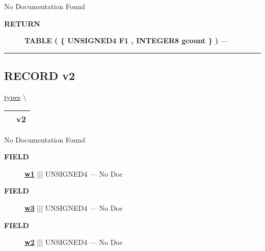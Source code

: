 \par





No Documentation Found








\par
\begin{description}
\item [\colorbox{tagtype}{\color{white} \textbf{\textsf{RETURN}}}] \textbf{TABLE ( \{ UNSIGNED4 F1 , INTEGER8 gcount \} )} --- 
\end{description}




\rule{\linewidth}{0.5pt}
\subsection*{\textsf{\colorbox{headtoc}{\color{white} RECORD}
v2}}

\hypertarget{ecldoc:types.v2}{}
\hspace{0pt} \hyperlink{ecldoc:types}{types} \textbackslash 

{\renewcommand{\arraystretch}{1.5}
\begin{tabularx}{\textwidth}{|>{\raggedright\arraybackslash}l|X|}
\hline
\hspace{0pt}\mytexttt{\color{red} } & \textbf{v2} \\
\hline
\end{tabularx}
}

\par





No Documentation Found







\par
\begin{description}
\item [\colorbox{tagtype}{\color{white} \textbf{\textsf{FIELD}}}] \textbf{\underline{w1}} ||| UNSIGNED4 --- No Doc
\item [\colorbox{tagtype}{\color{white} \textbf{\textsf{FIELD}}}] \textbf{\underline{w3}} ||| UNSIGNED4 --- No Doc
\item [\colorbox{tagtype}{\color{white} \textbf{\textsf{FIELD}}}] \textbf{\underline{w2}} ||| UNSIGNED4 --- No Doc
\end{description}





